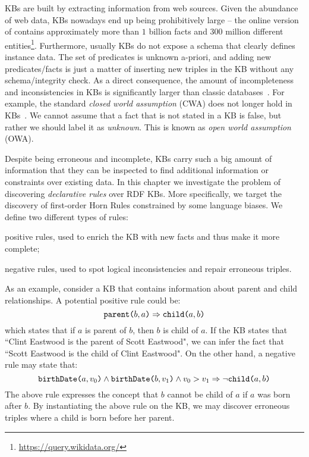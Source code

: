 KBs are built by extracting information from web sources. Given the abundance of web data, KBs nowadays end up being prohibitively large -- the online version of \wikidata contains approximately more than $1$ billion facts and $300$ million different entities\footnote{\url{https://query.wikidata.org/}}. Furthermore, usually KBs do not expose a schema that clearly defines instance data. The set of predicates is unknown a-priori, and adding new predicates/facts is just a matter of inserting new triples in the KB without any schema/integrity check. As a direct consequence, the amount of incompleteness and inconsistencies in KBs is significantly larger than classic databases~\cite{suchanek2009sofie}. For example, the standard \emph{closed world assumption} (CWA) does not longer hold in KBs~\cite{dong2014knowledge,galarraga2015fast}. We cannot assume that a fact that is not stated in a KB is false, but rather we should label it as \emph{unknown}. This is known as \emph{open world assumption} (OWA).

Despite being erroneous and incomplete, KBs carry such a big amount of information that they can be inspected to find additional information or constraints over existing data. In this chapter we investigate the problem of discovering \emph{declarative rules} over RDF KBs. More specifically, we target the discovery of first-order Horn Rules constrained by some language biases. We define two different types of rules:
\begin{inparaenum}[\itshape(i)]
	\item positive rules, used to enrich the KB with new facts and thus make it more complete;
	\item negative rules, used to spot logical inconsistencies and repair erroneous triples.
\end{inparaenum}

\begin{example}\label{ex:krd_intro}
	As an example, consider a KB that contains information about parent and child relationships.
	A potential positive rule could be:
	\begin{equation*}
		\texttt{parent(}b,a\texttt{)} \Rightarrow \texttt{child(}a,b\texttt{)}
	\end{equation*}
	which states that if $a$ is parent of $b$, then $b$ is child of $a$. If the KB states that ``Clint Eastwood is the parent of Scott Eastwood", we can infer the fact that ``Scott Eastwood is the child of Clint Eastwood".
	On the other hand, a negative rule may state that:
	\begin{equation*}
		\texttt{birthDate(}a,v_0\texttt{)} \wedge \texttt{birthDate(}b,v_1\texttt{)} \wedge v_0 > v_1 \Rightarrow \neg \texttt{child(}a,b\texttt{)} 
	\end{equation*}
	The above rule expresses the concept that $b$ cannot be child of $a$ if $a$ was born after $b$. By instantiating the above rule on the KB, we may discover erroneous triples where a child is born before her parent.
\end{example}

